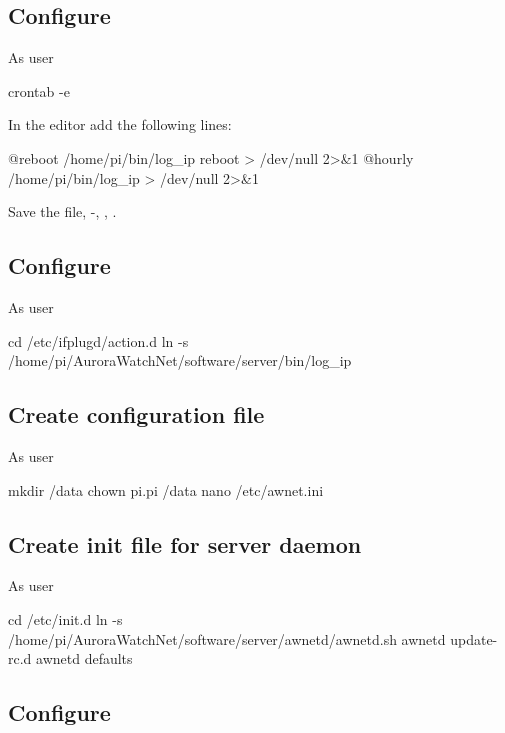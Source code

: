 \subsection{Configure \protect{}}
\label{sec:cron-configuration}
As user \piUser
\begin{Cmd}
crontab -e
\end{Cmd}

In the  editor add the following lines: 
\begin{Cmd}
@reboot /home/pi/bin/log_ip reboot > /dev/null 2>&1
@hourly /home/pi/bin/log_ip > /dev/null 2>&1
\end{Cmd}
Save the file, -, ,
\myreturn.

\subsection{Configure \protect{}}

As user \rootUser
\begin{Cmd}
cd /etc/ifplugd/action.d
ln -s /home/pi/AuroraWatchNet/software/server/bin/log_ip
\end{Cmd}

\subsection{Create configuration file}

As user \rootUser
\begin{Cmd}
mkdir /data
chown pi.pi /data
nano /etc/awnet.ini
\end{Cmd}


\subsection{Create init file for server daemon}
As user \rootUser
\begin{Cmd}
cd /etc/init.d
ln -s /home/pi/AuroraWatchNet/software/server/awnetd/awnetd.sh awnetd
update-rc.d  awnetd defaults
\end{Cmd}

\subsection{Configure \protect{}}
